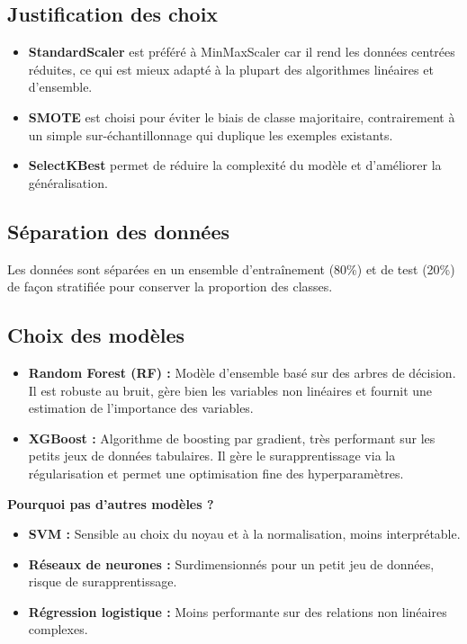 \documentclass[12pt,a4paper]{report}
\begin{document}
\subsection{Justification des choix}
\begin{itemize}
    \item \textbf{StandardScaler} est préféré à MinMaxScaler car il rend les données centrées réduites, ce qui est mieux adapté à la plupart des algorithmes linéaires et d'ensemble.
    \item \textbf{SMOTE} est choisi pour éviter le biais de classe majoritaire, contrairement à un simple sur-échantillonnage qui duplique les exemples existants.
    \item \textbf{SelectKBest} permet de réduire la complexité du modèle et d'améliorer la généralisation.
\end{itemize}

\subsection{Séparation des données}
Les données sont séparées en un ensemble d'entraînement (80\%) et de test (20\%) de façon stratifiée pour conserver la proportion des classes.

\subsection{Choix des modèles}
\begin{itemize}
    \item \textbf{Random Forest (RF) :} Modèle d'ensemble basé sur des arbres de décision. Il est robuste au bruit, gère bien les variables non linéaires et fournit une estimation de l'importance des variables.
    \item \textbf{XGBoost :} Algorithme de boosting par gradient, très performant sur les petits jeux de données tabulaires. Il gère le surapprentissage via la régularisation et permet une optimisation fine des hyperparamètres.
\end{itemize}

\textbf{Pourquoi pas d'autres modèles ?}
\begin{itemize}
    \item \textbf{SVM :} Sensible au choix du noyau et à la normalisation, moins interprétable.
    \item \textbf{Réseaux de neurones :} Surdimensionnés pour un petit jeu de données, risque de surapprentissage.
    \item \textbf{Régression logistique :} Moins performante sur des relations non linéaires complexes.
\end{itemize}
\end{document}
